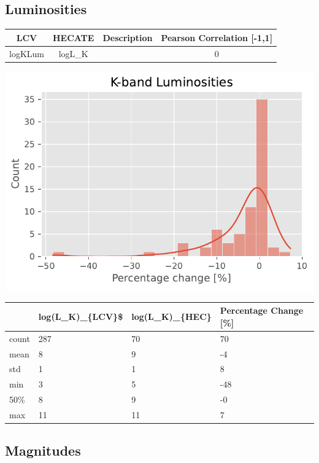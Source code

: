 \documentclass[
]{article}
\begin{document}
\subsection{Luminosities}\label{luminosities}

\begin{longtable}[]{@{}cccc@{}}
\toprule\noalign{}
LCV & HECATE & Description & Pearson Correlation {[}-1,1{]} \\
\midrule\noalign{}
\endhead
\bottomrule\noalign{}
\endlastfoot
logKLum & logL\_K & & 0 \\
\end{longtable}

\includegraphics{compare_files/figure-pdf/cell-34-output-1.pdf}

\begin{longtable}[]{@{}llll@{}}
\toprule\noalign{}
& log(L\_K)\_\{LCV\}\$ & log(L\_K)\_\{HEC\} & Percentage Change
{[}\%{]} \\
\midrule\noalign{}
\endhead
\bottomrule\noalign{}
\endlastfoot
count & 287 & 70 & 70 \\
mean & 8 & 9 & -4 \\
std & 1 & 1 & 8 \\
min & 3 & 5 & -48 \\
50\% & 8 & 9 & -0 \\
max & 11 & 11 & 7 \\
\end{longtable}

\subsection{Magnitudes}\label{magnitudes}
\end{document}

